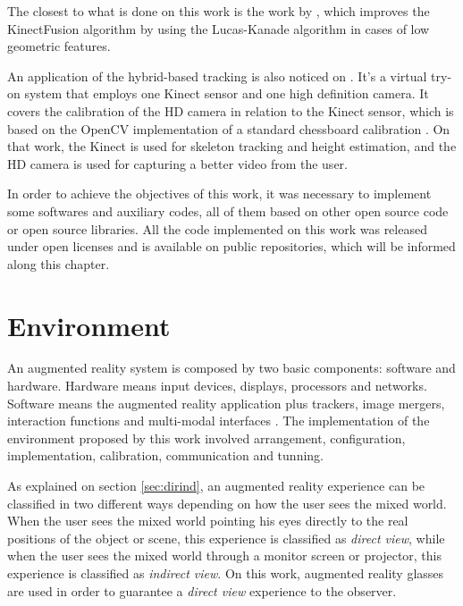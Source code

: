 \documentclass[msc, a4paper, classic, en]{ufbathesis}
\begin{document}
The closest to what is done on this work is the work by \cite{kinectkanade}, which improves the KinectFusion algorithm by using the Lucas-Kanade algorithm in cases of low geometric features.

An application of the hybrid-based tracking is also noticed on \cite{tryon}. It's a virtual try-on system that employs one Kinect sensor and one high definition camera. It covers the calibration of the HD camera in relation to the Kinect sensor, which is based on the OpenCV implementation of a standard chessboard calibration \cite{matlab}. On that work, the Kinect is used for skeleton tracking and height estimation, and the HD camera is used for capturing a better video from the user.


In order to achieve the objectives of this work, it was necessary to implement some softwares and auxiliary codes, all of them based on other open source code or open source libraries. All the code implemented on this work was released under open licenses and is available on public repositories, which will be informed along this chapter.

\section{Environment}
\label{sec:env}

An augmented reality system is composed by two basic components: software and hardware. Hardware means input devices, displays, processors and networks. Software means the augmented reality application plus trackers, image mergers, interaction functions and multi-modal interfaces \cite{tori2006fundamentos}. The implementation of the environment proposed by this work involved arrangement, configuration, implementation, calibration, communication and tunning.

As explained on section \ref{sec:dirind}, an augmented reality experience can be classified in two different ways depending on how the user sees the mixed world. When the user sees the mixed world pointing his eyes directly to the real positions of the object or scene, this experience is classified as \textit{direct view}, while when the user sees the mixed world through a monitor screen or projector, this experience is classified as \textit{indirect view}. On this work, augmented reality glasses are used in order to guarantee a \textit{direct view} experience to the observer.
\end{document}

